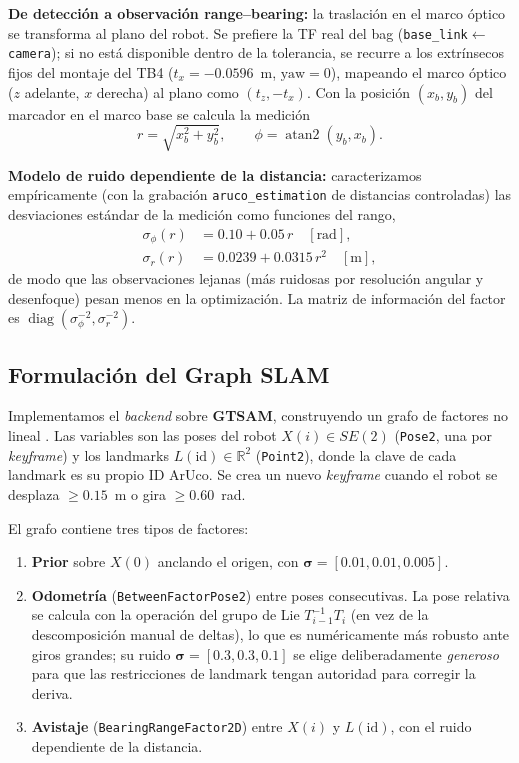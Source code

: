 \textbf{De detección a observación range--bearing:} la traslación en el marco óptico se transforma al plano del robot. Se prefiere la TF real del bag (\texttt{base\_link}$\leftarrow$\texttt{camera}); si no está disponible dentro de la tolerancia, se recurre a los extrínsecos fijos del montaje del TB4 ($t_x=-0.0596$~m, $\text{yaw}=0$), mapeando el marco óptico ($z$ adelante, $x$ derecha) al plano como $(t_z,-t_x)$. Con la posición $(x_b,y_b)$ del marcador en el marco base se calcula la medición
\begin{equation}
r=\sqrt{x_b^2+y_b^2},\qquad \phi=\operatorname{atan2}(y_b,x_b).
\end{equation}

\textbf{Modelo de ruido dependiente de la distancia:} caracterizamos empíricamente (con la grabación \texttt{aruco\_estimation} de distancias controladas) las desviaciones estándar de la medición como funciones del rango,
\begin{align}
\sigma_\phi(r) &= 0.10 + 0.05\,r \quad[\text{rad}],\\
\sigma_r(r) &= 0.0239 + 0.0315\,r^2 \quad[\text{m}],
\end{align}
de modo que las observaciones lejanas (más ruidosas por resolución angular y desenfoque) pesan menos en la optimización. La matriz de información del factor es $\operatorname{diag}(\sigma_\phi^{-2},\sigma_r^{-2})$.

\subsection{Formulación del Graph SLAM}
Implementamos el \emph{backend} sobre \textbf{GTSAM}, construyendo un grafo de factores no lineal \cite{grisetti}. Las variables son las poses del robot $X(i)\in SE(2)$ (\texttt{Pose2}, una por \emph{keyframe}) y los landmarks $L(\text{id})\in\mathbb{R}^2$ (\texttt{Point2}), donde la clave de cada landmark es su propio ID ArUco. Se crea un nuevo \emph{keyframe} cuando el robot se desplaza $\geq 0.15$~m o gira $\geq 0.60$~rad.

El grafo contiene tres tipos de factores:
\begin{enumerate}
\item \textbf{Prior} sobre $X(0)$ anclando el origen, con $\boldsymbol{\sigma}=[0.01,0.01,0.005]$.
\item \textbf{Odometría} (\texttt{BetweenFactorPose2}) entre poses consecutivas. La pose relativa se calcula con la operación del grupo de Lie $T_{i-1}^{-1}T_i$ (en vez de la descomposición manual de deltas), lo que es numéricamente más robusto ante giros grandes; su ruido $\boldsymbol{\sigma}=[0.3,0.3,0.1]$ se elige deliberadamente \emph{generoso} para que las restricciones de landmark tengan autoridad para corregir la deriva.
\item \textbf{Avistaje} (\texttt{BearingRangeFactor2D}) entre $X(i)$ y $L(\text{id})$, con el ruido dependiente de la distancia.
\end{enumerate}

